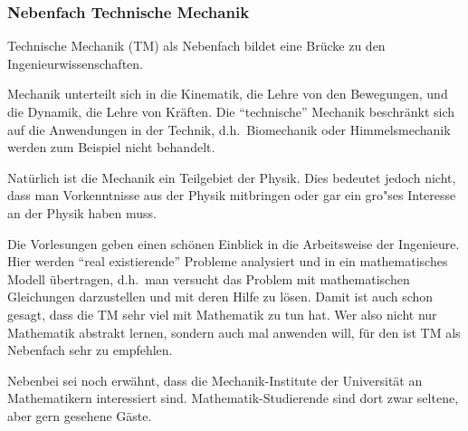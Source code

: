 \subsubsection{Nebenfach Technische Mechanik} 

Technische Mechanik (TM) als Nebenfach bildet
eine Brücke zu den Ingenieurwissenschaften.

Mechanik unterteilt sich in die Kinematik,
die Lehre von den Bewegungen, 
und die Dynamik, die Lehre von Kräften.
Die "`technische"' Mechanik beschränkt sich
auf die Anwendungen in der Technik,
d.h.\ Biomechanik oder Himmelsmechanik
werden zum Beispiel nicht behandelt.

Natürlich ist die Mechanik ein Teilgebiet der Physik.
Dies bedeutet jedoch nicht,
dass man Vorkenntnisse aus der Physik mitbringen 
oder gar ein gro"ses Interesse an der Physik haben muss.

Die Vorlesungen geben einen schönen Einblick
in die Arbeitsweise der Ingenieure.
Hier werden "`real existierende"' Probleme analysiert
und in ein mathe\-mati\-sches Modell übertragen,
d.h.\ man versucht das Problem mit mathematischen Gleichungen
darzustellen und mit deren Hilfe zu lösen.
Damit ist auch schon gesagt,
dass die TM sehr viel mit Mathematik zu tun hat. 
Wer also nicht nur Mathematik abstrakt lernen,
sondern auch mal anwenden will,
für den ist TM als Nebenfach sehr zu empfehlen. 

Nebenbei sei noch erwähnt, dass die Mechanik-Institute
der Universität an Mathematikern interessiert sind.
Mathematik-Studierende sind dort zwar seltene,
aber gern gesehene Gäste.


